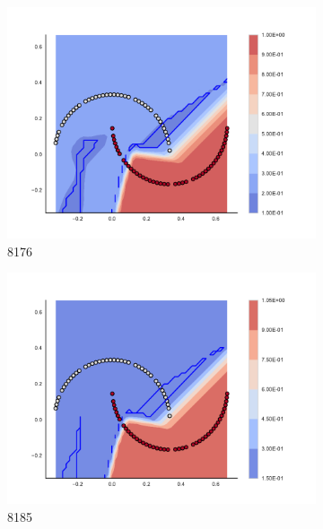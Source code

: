 \begin{figure}[h]
\begin{subfigure}[b]{0.09\textwidth}
    \includegraphics[clip, trim=2.35cm 1.75cm 4.5cm 0cm,width=\textwidth]{img/convergence/8176.pdf}
    \caption{8176}
    \label{fig:convergence_8176}
\end{subfigure}
%
\begin{subfigure}[b]{0.09\textwidth}
    \includegraphics[clip, trim=2.35cm 1.75cm 4.5cm 0cm,width=\textwidth]{img/convergence/8185.pdf}
    \caption{8185}
    \label{fig:convergence_8185}
\end{subfigure}
%
\begin{subfigure}[b]{0.09\textwidth}

\end{subfigure}
\end{figure}
